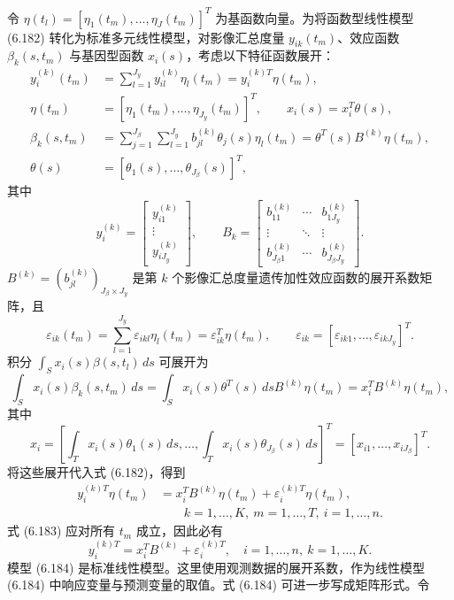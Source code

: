 令 $\eta(t_l)=[\eta_1(t_m),\ldots,\eta_J(t_m)]^T$ 为基函数向量。为将函数型线性模型 (6.182) 转化为标准多元线性模型，对影像汇总度量 $y_{ik}(t_m)$、效应函数 $\beta_k(s,t_m)$ 与基因型函数 $x_i(s)$，考虑以下特征函数展开：
\[
\begin{aligned}
y_i^{(k)}(t_m)&=\sum_{l=1}^{J_y}y_{il}^{(k)}\eta_l(t_m)=y_i^{(k)T}\eta(t_m),\\
\eta(t_m)&=[\eta_1(t_m),\ldots,\eta_{J_y}(t_m)]^T,\qquad x_i(s)=x_i^T\theta(s),\\
\beta_k(s,t_m)&=\sum_{j=1}^{J_\beta}\sum_{l=1}^{J_y}b_{jl}^{(k)}\theta_j(s)\eta_l(t_m)=\theta^T(s)B^{(k)}\eta(t_m),\\
\theta(s)&=[\theta_1(s),\ldots,\theta_{J_\beta}(s)]^T,
\end{aligned}
\]
其中
\[
y_i^{(k)}=\begin{bmatrix}y_{i1}^{(k)}\\\vdots\\y_{iJ_y}^{(k)}\end{bmatrix},\qquad
B_k=\begin{bmatrix}b_{11}^{(k)}&\cdots&b_{1J_y}^{(k)}\\\vdots&\ddots&\vdots\\b_{J_\beta1}^{(k)}&\cdots&b_{J_\beta J_y}^{(k)}\end{bmatrix}.
\]
$B^{(k)}=(b_{jl}^{(k)})_{J_\beta\times J_y}$ 是第 $k$ 个影像汇总度量遗传加性效应函数的展开系数矩阵，且
\[
\varepsilon_{ik}(t_m)=\sum_{l=1}^{J_y}\varepsilon_{ikl}\eta_l(t_m)=\varepsilon_{ik}^T\eta(t_m),\qquad
\varepsilon_{ik}=[\varepsilon_{ik1},\ldots,\varepsilon_{ikJ_y}]^T.
\]
积分 $\int_Sx_i(s)\beta(s,t_l)\,ds$ 可展开为
\[
\int_Sx_i(s)\beta_k(s,t_m)\,ds=\int_Sx_i(s)\theta^T(s)\,dsB^{(k)}\eta(t_m)=x_i^TB^{(k)}\eta(t_m),
\]
其中
\[
x_i=\left[\int_Tx_i(s)\theta_1(s)\,ds,\ldots,\int_Tx_i(s)\theta_{J_\beta}(s)\,ds\right]^T=[x_{i1},\ldots,x_{iJ_\beta}]^T.
\]
将这些展开代入式 (6.182)，得到
\begin{equation}
\begin{aligned}
y_i^{(k)T}\eta(t_m)&=x_i^TB^{(k)}\eta(t_m)+\varepsilon_i^{(k)T}\eta(t_m),\\
&\qquad k=1,\ldots,K,\ m=1,\ldots,T,\ i=1,\ldots,n.
\end{aligned}\tag{6.183}
\end{equation}
式 (6.183) 应对所有 $t_m$ 成立，因此必有
\begin{equation}
y_i^{(k)T}=x_i^TB^{(k)}+\varepsilon_i^{(k)T},\quad i=1,\ldots,n,\ k=1,\ldots,K.
\tag{6.184}
\end{equation}
模型 (6.184) 是标准线性模型。这里使用观测数据的展开系数，作为线性模型 (6.184) 中响应变量与预测变量的取值。式 (6.184) 可进一步写成矩阵形式。令
